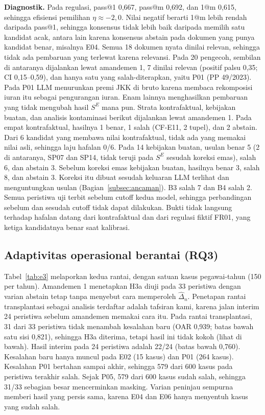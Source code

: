 \documentclass[conference]{IEEEtran}
\makeatletter
\DeclareRobustCommand{\en}[1]{{\usefont{\f@encoding}{\f@family}{\f@series}{it}#1\/}}
\newcommand{\SE}{S^{E}}
\makeatother
\begin{document}
\textbf{Diagnostik.} Pada regulasi, \en{pass@1} 0,667, \en{pass@m} 0,692, dan \en{1@m} 0,615, sehingga efisiensi pemilihan $\eta \approx -2{,}0$. Nilai negatif berarti \en{1@m} lebih rendah daripada \en{pass@1}, sehingga konsensus tidak lebih baik daripada memilih satu kandidat acak, antara lain karena konsensus \en{abstain} pada dokumen yang punya kandidat benar, misalnya E04. Semua 18 dokumen nyata dinilai relevan, sehingga tidak ada pembaruan yang terlewat karena relevansi. Pada 20 pengecoh, sembilan di antaranya dijalankan lewat amandemen 1, 7 dinilai relevan (positif palsu 0,35; CI 0,15--0,59), dan hanya satu yang salah-diterapkan, yaitu P01 (PP 49/2023). Pada P01 LLM menurunkan premi JKK di bruto karena membaca rekomposisi iuran itu sebagai pengurangan iuran. Enam lainnya menghasilkan pembaruan yang tidak mengubah hasil $\SE$ mana pun. Strata kontrafaktual, kebijakan buatan, dan analisis kontaminasi berikut dijalankan lewat amandemen 1. Pada empat kontrafaktual, hasilnya 1 benar, 1 salah (CF-E11, 2 tupel), dan 2 \en{abstain}. Dari 6 kandidat yang membawa nilai kontrafaktual, tidak ada yang memakai nilai asli, sehingga laju hafalan 0/6. Pada 14 kebijakan buatan, usulan benar 5 (2 di antaranya, SP07 dan SP14, tidak teruji pada $\SE$ sesudah koreksi emas), salah 6, dan \en{abstain} 3. Sebelum koreksi emas kebijakan buatan, hasilnya benar 3, salah 8, dan \en{abstain} 3. Koreksi itu dibuat sesudah keluaran LLM terlihat dan menguntungkan usulan (Bagian~\ref{subsec:ancaman}). B3 salah 7 dan B4 salah 2. Semua peristiwa uji terbit sebelum \en{cutoff} kedua model, sehingga perbandingan sebelum dan sesudah \en{cutoff} tidak dapat dilakukan. Bukti tidak langsung terhadap hafalan datang dari kontrafaktual dan dari regulasi fiktif FR01, yang ketiga kandidatnya benar saat kalibrasi.

\subsection{Adaptivitas operasional berantai (RQ3)}
\label{subsec:hasil-rq3}
Tabel~\ref{tab:e3} melaporkan kedua rantai, dengan satuan kasus pegawai-tahun (150 per tahun). Amandemen 1 menetapkan H3a diuji pada 33 peristiwa dengan varian \en{abstain} tetap tanpa menyebut cara memperoleh $\hat{\Delta}_n$. Penetapan rantai transplantasi sebagai analisis terdaftar adalah tafsiran kami, karena jalan interim 24 peristiwa sebelum amandemen memakai cara itu. Pada rantai transplantasi, 31 dari 33 peristiwa tidak menambah kesalahan baru (OAR 0,939; batas bawah satu sisi 0,821), sehingga H3a diterima, tetapi hasil ini tidak kokoh (lihat di bawah). Hasil interim pada 24 peristiwa adalah 22/24 (batas bawah 0,760). Kesalahan baru hanya muncul pada E02 (15 kasus) dan P01 (264 kasus). Kesalahan P01 bertahan sampai akhir, sehingga 579 dari 600 kasus pada peristiwa terakhir salah. Sejak P05, 579 dari 600 kasus sudah salah, sehingga 31/33 sebagian besar mencerminkan \en{masking}. Varian peninjau sempurna memberi hasil yang persis sama, karena E04 dan E06 hanya menyentuh kasus yang sudah salah.
\end{document}
